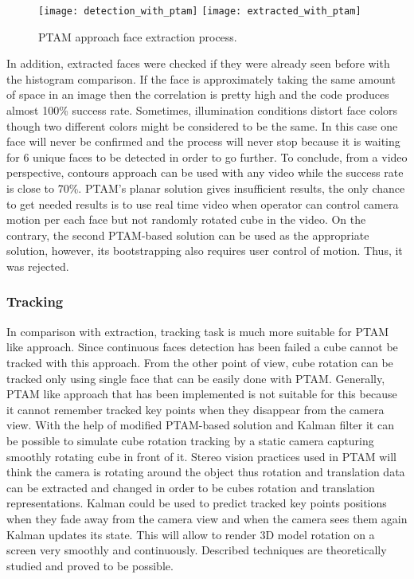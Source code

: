\documentclass[../../main.tex]{subfiles}
\begin{document}
\begin{figure} [ht!]
    \begin{center}
        \texttt{[image: detection\_with\_ptam]}
        \texttt{[image: extracted\_with\_ptam]}
        \caption{\ac{PTAM} approach face extraction process.}
        \label{fig:ptam_approach_face_detection}
    \end{center}
\end{figure}

In addition, extracted faces were checked if they were already seen before with the histogram comparison. If the face is approximately taking the same amount of space in an image then the correlation is pretty high and the code produces almost 100\% success rate. Sometimes, illumination conditions distort face colors though two different colors might be considered to be the same. In this case one face will never be confirmed and the process will never stop because it is waiting for 6 unique faces to be detected in order to go further.
To conclude, from a video perspective, contours approach can be used with any video while the success rate is close to 70\%. \ac{PTAM}'s planar solution gives insufficient results, the only chance to get needed results is to use real time video when operator can control camera motion per each face but not randomly rotated cube in the video. On the contrary, the second \ac{PTAM}-based solution can be used as the appropriate solution, however, its bootstrapping also requires user control of motion. Thus, it was rejected.

\subsubsection*{Tracking}

In comparison with extraction, tracking task is much more suitable for \ac{PTAM} like approach. Since continuous faces detection has been failed a cube cannot be tracked with this approach. From the other point of view, cube rotation can be tracked only using single face that can be easily done with \ac{PTAM}. Generally, \ac{PTAM} like approach that has been implemented is not suitable for this because it cannot remember tracked key points when they disappear from the camera view. With the help of modified \ac{PTAM}-based solution and Kalman filter it can be possible to simulate cube rotation tracking by a static camera capturing smoothly rotating cube in front of it. Stereo vision practices used in \ac{PTAM} will think the camera is rotating around the object thus rotation and translation data can be extracted and changed in order to be cubes rotation and translation representations. Kalman could be used to predict tracked key points positions when they fade away from the camera view and when the camera sees them again Kalman updates its state. This will allow to render 3D model rotation on a screen very smoothly and continuously. Described techniques are theoretically studied and proved to be possible.
\end{document}
